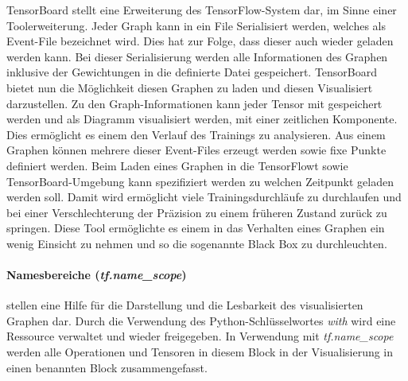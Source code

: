 TensorBoard stellt eine Erweiterung des TensorFlow-System dar, im Sinne einer Toolerweiterung. 
Jeder Graph kann in ein File Serialisiert werden, welches als Event-File bezeichnet wird. 
Dies hat zur Folge, dass dieser auch wieder geladen werden kann. 
Bei dieser Serialisierung werden alle Informationen des Graphen inklusive der Gewichtungen in die definierte Datei gespeichert.
TensorBoard bietet nun die Möglichkeit diesen Graphen zu laden und diesen Visualisiert darzustellen.
Zu den Graph-Informationen kann jeder Tensor mit gespeichert werden und als Diagramm visualisiert werden, mit einer zeitlichen Komponente. 
Dies ermöglicht es einem den Verlauf des Trainings zu analysieren. 
Aus einem Graphen können mehrere dieser Event-Files erzeugt werden sowie fixe Punkte definiert werden. 
Beim Laden eines Graphen in die TensorFlowt sowie TensorBoard-Umgebung kann spezifiziert werden zu welchen Zeitpunkt geladen werden soll. 
Damit wird ermöglicht viele Trainingsdurchläufe zu durchlaufen und bei einer Verschlechterung der Präzision zu einem früheren Zustand zurück zu springen.
Diese Tool ermöglichte es einem in das Verhalten eines Graphen ein wenig Einsicht zu nehmen und so die sogenannte Black Box zu durchleuchten. 

\paragraph{Namesbereiche (\textit{tf.name\_scope})} stellen eine Hilfe für die Darstellung und die Lesbarkeit des visualisierten Graphen dar. 
Durch die Verwendung des Python-Schlüsselwortes \textit{with} wird eine Ressource verwaltet und wieder freigegeben. 
In Verwendung mit \textit{tf.name\_scope} werden alle Operationen und Tensoren in diesem Block in der Visualisierung in einen benannten Block zusammengefasst.

